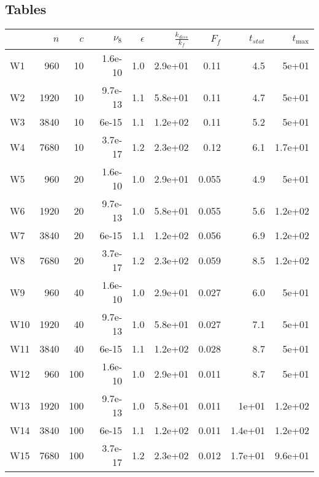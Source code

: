 \documentclass[a4paper]{article}
\begin{document}
\subsection{Tables}
\begin{tabular}{lrrrrrrrr}
\toprule
{} &   $n$ &  $c$ &  $\nu_8$ &  $\epsilon$ &  $\frac{k_{diss}}{k_f}$ &  $F_f$ &  $t_{stat}$ &  $t_{\max}$ \\
\midrule
W1  &   960 &   10 &  1.6e-10 &         1.0 &                 2.9e+01 &   0.11 &         4.5 &       5e+01 \\
W2  &  1920 &   10 &  9.7e-13 &         1.1 &                 5.8e+01 &   0.11 &         4.7 &       5e+01 \\
W3  &  3840 &   10 &    6e-15 &         1.1 &                 1.2e+02 &   0.11 &         5.2 &       5e+01 \\
W4  &  7680 &   10 &  3.7e-17 &         1.2 &                 2.3e+02 &   0.12 &         6.1 &     1.7e+01 \\
W5  &   960 &   20 &  1.6e-10 &         1.0 &                 2.9e+01 &  0.055 &         4.9 &       5e+01 \\
W6  &  1920 &   20 &  9.7e-13 &         1.0 &                 5.8e+01 &  0.055 &         5.6 &     1.2e+02 \\
W7  &  3840 &   20 &    6e-15 &         1.1 &                 1.2e+02 &  0.056 &         6.9 &     1.2e+02 \\
W8  &  7680 &   20 &  3.7e-17 &         1.2 &                 2.3e+02 &  0.059 &         8.5 &     1.2e+02 \\
W9  &   960 &   40 &  1.6e-10 &         1.0 &                 2.9e+01 &  0.027 &         6.0 &       5e+01 \\
W10 &  1920 &   40 &  9.7e-13 &         1.0 &                 5.8e+01 &  0.027 &         7.1 &       5e+01 \\
W11 &  3840 &   40 &    6e-15 &         1.1 &                 1.2e+02 &  0.028 &         8.7 &       5e+01 \\
W12 &   960 &  100 &  1.6e-10 &         1.0 &                 2.9e+01 &  0.011 &         8.7 &       5e+01 \\
W13 &  1920 &  100 &  9.7e-13 &         1.0 &                 5.8e+01 &  0.011 &       1e+01 &     1.2e+02 \\
W14 &  3840 &  100 &    6e-15 &         1.1 &                 1.2e+02 &  0.011 &     1.4e+01 &     1.2e+02 \\
W15 &  7680 &  100 &  3.7e-17 &         1.2 &                 2.3e+02 &  0.012 &     1.7e+01 &     9.6e+01 \\

\end{tabular}
\end{document}

